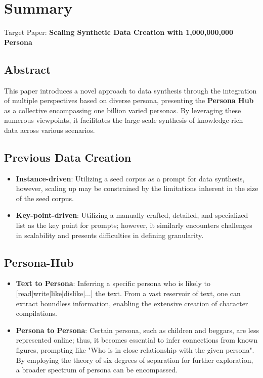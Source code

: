 \section{Summary}
Target Paper: \textbf{Scaling Synthetic Data Creation with 1,000,000,000 Persona} \cite{Chan2024ScalingSD}

\subsection{Abstract}
This paper introduces a novel approach to data synthesis through the integration of multiple perspectives based on diverse persona, presenting the \textbf{Persona Hub} as a collective encompassing one billion varied personas. By leveraging these numerous viewpoints, it facilitates the large-scale synthesis of knowledge-rich data across various scenarios.

\subsection{Previous Data Creation}
\begin{itemize}
    \item \textbf{Instance-driven}: Utilizing a seed corpus as a prompt for data synthesis, however, scaling up may be constrained by the limitations inherent in the size of the seed corpus.
    \item \textbf{Key-point-driven}: Utilizing a manually crafted, detailed, and specialized list as the key point for prompts; however, it similarly encounters challenges in scalability and presents difficulties in defining granularity.
\end{itemize}

\subsection{Persona-Hub}
\begin{itemize}
    \item \textbf{Text to Persona}: Inferring a specific persona who is likely to [read|write|like|dislike|...] the text. From a vast reservoir of text, one can extract boundless information, enabling the extensive creation of character compilations.
    \item \textbf{Persona to Persona}: Certain persona, such as children and beggars, are less represented online; thus, it becomes essential to infer connections from known figures, prompting like "Who is in close relationship with the given persona". By employing the theory of six degrees of separation for further exploration, a broader spectrum of persona can be encompassed.
\end{itemize}

